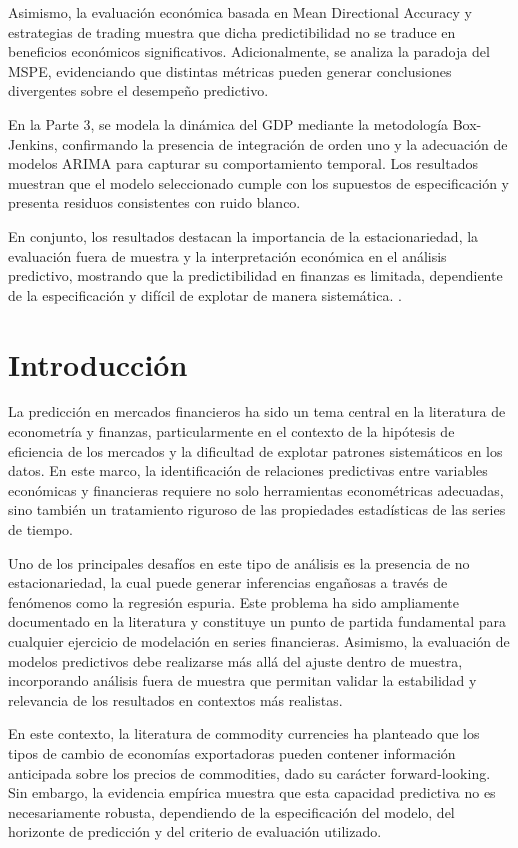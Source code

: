 \documentclass[11pt,a4paper]{article}
\begin{document}
	Asimismo, la evaluación económica basada en Mean Directional Accuracy y estrategias de trading muestra que dicha predictibilidad no se traduce en beneficios económicos significativos. Adicionalmente, se analiza la paradoja del MSPE, evidenciando que distintas métricas pueden generar conclusiones divergentes sobre el desempeño predictivo.

	En la Parte 3, se modela la dinámica del GDP mediante la metodología Box-Jenkins, confirmando la presencia de integración de orden uno y la adecuación de modelos ARIMA para capturar su comportamiento temporal. Los resultados muestran que el modelo seleccionado cumple con los supuestos de especificación y presenta residuos consistentes con ruido blanco.
	
	En conjunto, los resultados destacan la importancia de la estacionariedad, la evaluación fuera de muestra y la interpretación económica en el análisis predictivo, mostrando que la predictibilidad en finanzas es limitada, dependiente de la especificación y difícil de explotar de manera sistemática.
.
	\newpage
	\section{Introducción}
	
	La predicción en mercados financieros ha sido un tema central en la literatura de econometría y finanzas, particularmente en el contexto de la hipótesis de eficiencia de los mercados y la dificultad de explotar patrones sistemáticos en los datos. En este marco, la identificación de relaciones predictivas entre variables económicas y financieras requiere no solo herramientas econométricas adecuadas, sino también un tratamiento riguroso de las propiedades estadísticas de las series de tiempo.

	Uno de los principales desafíos en este tipo de análisis es la presencia de no estacionariedad, la cual puede generar inferencias engañosas a través de fenómenos como la regresión espuria. Este problema ha sido ampliamente documentado en la literatura y constituye un punto de partida fundamental para cualquier ejercicio de modelación en series financieras. Asimismo, la evaluación de modelos predictivos debe realizarse más allá del ajuste dentro de muestra, incorporando análisis fuera de muestra que permitan validar la estabilidad y relevancia de los resultados en contextos más realistas.

	En este contexto, la literatura de commodity currencies ha planteado que los tipos de cambio de economías exportadoras pueden contener información anticipada sobre los precios de commodities, dado su carácter forward-looking. Sin embargo, la evidencia empírica muestra que esta capacidad predictiva no es necesariamente robusta, dependiendo de la especificación del modelo, del horizonte de predicción y del criterio de evaluación utilizado.
\end{document}
